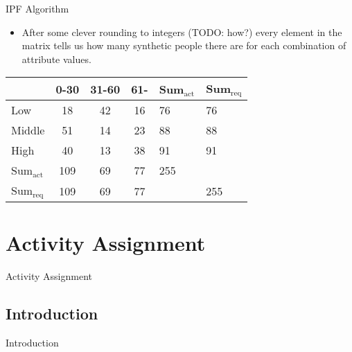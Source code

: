 \documentclass{beamer}
\begin{document}
\begin{frame}{IPF Algorithm}
\begin{itemize}
  \item After some clever rounding to integers (TODO: how?) every element in the matrix tells us how many synthetic people
there are for each combination of attribute values.
\end{itemize}

\begin{table}
\centering
\begin{tabular}{l||c c c||l|l}
 & 0-30 & 31-60 & 61- & Sum$_{\mathrm{act}}$ & Sum$_{\mathrm{req}}$\\
\hline \hline
Low & 18 & 42 & 16 & 76 & 76 \\
Middle & 51 & 14 & 23 & 88 & 88 \\
High & 40 & 13 & 38 & 91 & 91 \\
\hline \hline
Sum$_{\mathrm{act}}$ & 109 & 69 & 77 & 255 & \\
\hline
Sum$_{\mathrm{req}}$ & 109 & 69 & 77 & & 255 \\
\end{tabular}
\end{table}
\end{frame}


\section{Activity Assignment}
\begin{frame}
  \centering
  \LARGE 
  Activity Assignment
\end{frame}


\subsection{Introduction}
\begin{frame}{Introduction}
\end{frame}
\end{document}
